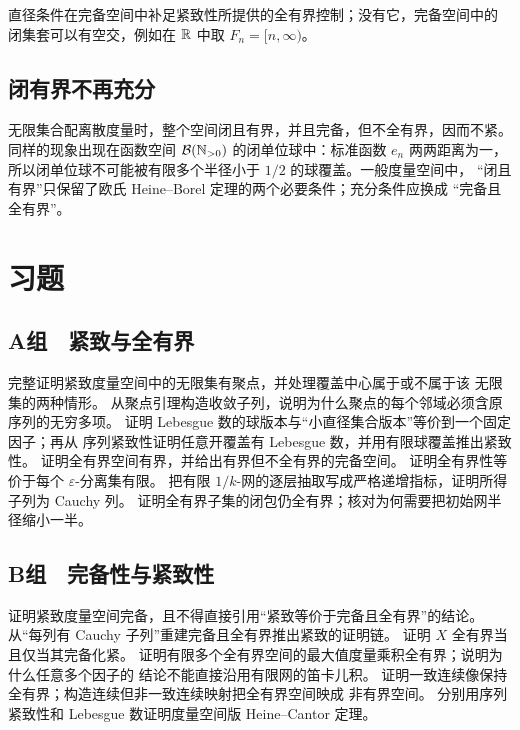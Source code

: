 直径条件在完备空间中补足紧致性所提供的全有界控制；没有它，完备空间中的
闭集套可以有空交，例如在 \(\mathbb{R}\) 中取 \(F_n=[n,\infty)\)。

\subsection{闭有界不再充分}

无限集合配离散度量时，整个空间闭且有界，并且完备，但不全有界，因而不紧。
同样的现象出现在函数空间
\(\mathcal B(\mathbb{N}_{>0})\) 的闭单位球中：标准函数 \(e_n\) 两两距离为一，
所以闭单位球不可能被有限多个半径小于 \(1/2\) 的球覆盖。一般度量空间中，
“闭且有界”只保留了欧氏 Heine--Borel 定理的两个必要条件；充分条件应换成
“完备且全有界”。

\section*{习题}

\subsection*{A组　紧致与全有界}
\begin{enumerate}[label=\textbf{\thechapter.\arabic*.}]
 完整证明紧致度量空间中的无限集有聚点，并处理覆盖中心属于或不属于该
 无限集的两种情形。
 从聚点引理构造收敛子列，说明为什么聚点的每个邻域必须含原序列的无穷多项。
 证明 Lebesgue 数的球版本与“小直径集合版本”等价到一个固定因子；再从
 序列紧致性证明任意开覆盖有 Lebesgue 数，并用有限球覆盖推出紧致性。
 证明全有界空间有界，并给出有界但不全有界的完备空间。
 证明全有界性等价于每个 \(\varepsilon\)-分离集有限。
 把有限 \(1/k\)-网的逐层抽取写成严格递增指标，证明所得子列为 Cauchy 列。
 证明全有界子集的闭包仍全有界；核对为何需要把初始网半径缩小一半。
\end{enumerate}

\subsection*{B组　完备性与紧致性}
\begin{enumerate}[label=\textbf{\thechapter.\arabic*.},resume]
 证明紧致度量空间完备，且不得直接引用“紧致等价于完备且全有界”的结论。
 从“每列有 Cauchy 子列”重建完备且全有界推出紧致的证明链。
 证明 \(X\) 全有界当且仅当其完备化紧。
 证明有限多个全有界空间的最大值度量乘积全有界；说明为什么任意多个因子的
 结论不能直接沿用有限网的笛卡儿积。
 证明一致连续像保持全有界；构造连续但非一致连续映射把全有界空间映成
 非有界空间。
 分别用序列紧致性和 Lebesgue 数证明度量空间版 Heine--Cantor 定理。
\end{enumerate}

